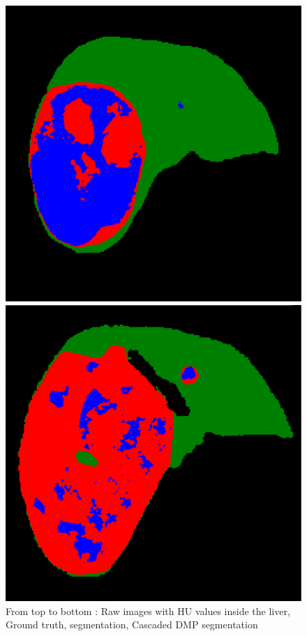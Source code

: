\begin{figure}[!ht]
\begin{minipage}{4cm}
\end{minipage} \hspace{-0.3cm}
\begin{minipage}{4cm}
\includegraphics[width=\linewidth]{./images/5_2_Cascade_resized}
\end{minipage} \hspace{-0.3cm}
\begin{minipage}{4cm}
\includegraphics[width=\linewidth]{./images/5_8_Cascade_resized}
\end{minipage} 
\caption{From top to bottom : Raw images with HU values inside the liver, Ground truth,  segmentation, Cascaded DMP segmentation}
\label{CompareFullCascade}
\end{figure}



